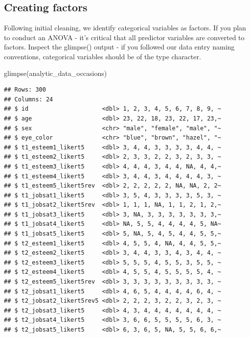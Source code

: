 \documentclass[
]{krantz}
\makeatletter
\newenvironment{Shaded}{\begin{snugshade}}{\end{snugshade}}
\newcommand{\FunctionTok}[1]{\textcolor[rgb]{0,0,0}{#1}}
\newcommand{\NormalTok}[1]{#1}
\newenvironment{kframe}{%
\medskip{}
\setlength{\fboxsep}{.8em}
 \def\at@end@of@kframe{}%
 \ifinner\ifhmode%
  \def\at@end@of@kframe{\end{minipage}}%
  \begin{minipage}{\columnwidth}%
 \fi\fi%
 \def\FrameCommand##1{\hskip\@totalleftmargin \hskip-\fboxsep
 \colorbox{shadecolor}{##1}\hskip-\fboxsep
     \hskip-\linewidth \hskip-\@totalleftmargin \hskip\columnwidth}%
 \MakeFramed {\advance\hsize-\width
   \@totalleftmargin\z@ \linewidth\hsize
   \@setminipage}}%
 {\par\unskip\endMakeFramed%
 \at@end@of@kframe}
\renewenvironment{Shaded}{\begin{kframe}}{\end{kframe}}
\makeatother
\begin{document}
\hypertarget{creating-factors-4}{%
\subsection{Creating factors}\label{creating-factors-4}}

Following initial cleaning, we identify categorical variables as factors. If you plan to conduct an ANOVA - it's critical that all predictor variables are converted to factors. Inspect the glimpse() output - if you followed our data entry naming conventions, categorical variables should be of the type character.

\begin{Shaded}
\begin{Highlighting}[]
\FunctionTok{glimpse}\NormalTok{(analytic\_data\_occasions)}
\end{Highlighting}
\end{Shaded}

\begin{verbatim}
## Rows: 300
## Columns: 24
## $ id                     <dbl> 1, 2, 3, 4, 5, 6, 7, 8, 9, ~
## $ age                    <dbl> 23, 22, 18, 23, 22, 17, 23,~
## $ sex                    <chr> "male", "female", "male", "~
## $ eye_color              <chr> "blue", "brown", "hazel", "~
## $ t1_esteem1_likert5     <dbl> 3, 4, 4, 3, 3, 3, 3, 4, 4, ~
## $ t1_esteem2_likert5     <dbl> 2, 3, 3, 2, 2, 3, 2, 3, 3, ~
## $ t1_esteem3_likert5     <dbl> 4, 4, 4, 3, 4, 4, NA, 4, 4,~
## $ t1_esteem4_likert5     <dbl> 3, 4, 4, 3, 4, 4, 4, 4, 3, ~
## $ t1_esteem5_likert5rev  <dbl> 2, 2, 2, 2, 2, NA, NA, 2, 2~
## $ t1_jobsat1_likert5     <dbl> 3, 5, 4, 3, 3, 3, 3, 5, 3, ~
## $ t1_jobsat2_likert5rev  <dbl> 1, 1, 1, NA, 1, 1, 2, 1, 2,~
## $ t1_jobsat3_likert5     <dbl> 3, NA, 3, 3, 3, 3, 3, 3, 3,~
## $ t1_jobsat4_likert5     <dbl> NA, 5, 5, 4, 4, 4, 4, 5, NA~
## $ t1_jobsat5_likert5     <dbl> 5, NA, 5, 4, 5, 4, 4, 5, 5,~
## $ t2_esteem1_likert5     <dbl> 4, 5, 5, 4, NA, 4, 4, 5, 5,~
## $ t2_esteem2_likert5     <dbl> 3, 4, 4, 3, 3, 4, 3, 4, 4, ~
## $ t2_esteem3_likert5     <dbl> 5, 5, 5, 4, 5, 5, 3, 5, 5, ~
## $ t2_esteem4_likert5     <dbl> 4, 5, 5, 4, 5, 5, 5, 5, 4, ~
## $ t2_esteem5_likert5rev  <dbl> 3, 3, 3, 3, 3, 3, 3, 3, 3, ~
## $ t2_jobsat1_likert5     <dbl> 4, 6, 5, 4, 4, 4, 4, 6, 4, ~
## $ t2_jobsat2_likert5rev5 <dbl> 2, 2, 2, 3, 2, 2, 3, 2, 3, ~
## $ t2_jobsat3_likert5     <dbl> 4, 3, 4, 4, 4, 4, 4, 4, 4, ~
## $ t2_jobsat4_likert5     <dbl> 3, 6, 6, 5, 5, 5, 5, 6, 3, ~
## $ t2_jobsat5_likert5     <dbl> 6, 3, 6, 5, NA, 5, 5, 6, 6,~
\end{verbatim}
\end{document}

